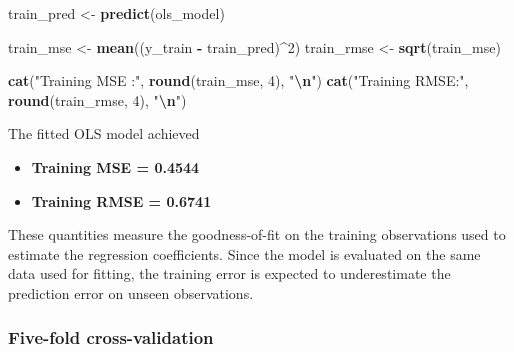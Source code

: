 \documentclass[
  11pt,
]{article}
\newenvironment{Shaded}{\begin{snugshade}}{\end{snugshade}}
\newcommand{\DecValTok}[1]{\textcolor[rgb]{0.00,0.00,0.81}{#1}}
\newcommand{\FunctionTok}[1]{\textcolor[rgb]{0.13,0.29,0.53}{\textbf{#1}}}
\newcommand{\NormalTok}[1]{#1}
\newcommand{\OtherTok}[1]{\textcolor[rgb]{0.56,0.35,0.01}{#1}}
\newcommand{\SpecialCharTok}[1]{\textcolor[rgb]{0.81,0.36,0.00}{\textbf{#1}}}
\newcommand{\StringTok}[1]{\textcolor[rgb]{0.31,0.60,0.02}{#1}}
\providecommand{\tightlist}{%
  \setlength{\itemsep}{0pt}\setlength{\parskip}{0pt}}
\begin{document}
\begin{Shaded}
\begin{Highlighting}[]
\NormalTok{train\_pred }\OtherTok{\textless{}{-}} \FunctionTok{predict}\NormalTok{(ols\_model)}

\NormalTok{train\_mse }\OtherTok{\textless{}{-}} \FunctionTok{mean}\NormalTok{((y\_train }\SpecialCharTok{{-}}\NormalTok{ train\_pred)}\SpecialCharTok{\^{}}\DecValTok{2}\NormalTok{)}
\NormalTok{train\_rmse }\OtherTok{\textless{}{-}} \FunctionTok{sqrt}\NormalTok{(train\_mse)}

\FunctionTok{cat}\NormalTok{(}\StringTok{"Training MSE :"}\NormalTok{, }\FunctionTok{round}\NormalTok{(train\_mse, }\DecValTok{4}\NormalTok{), }\StringTok{"}\SpecialCharTok{\textbackslash{}n}\StringTok{"}\NormalTok{)}
\FunctionTok{cat}\NormalTok{(}\StringTok{"Training RMSE:"}\NormalTok{, }\FunctionTok{round}\NormalTok{(train\_rmse, }\DecValTok{4}\NormalTok{), }\StringTok{"}\SpecialCharTok{\textbackslash{}n}\StringTok{"}\NormalTok{)}
\end{Highlighting}
\end{Shaded}

The fitted OLS model achieved

\begin{itemize}
\tightlist
\item
  \textbf{Training MSE = 0.4544}
\item
  \textbf{Training RMSE = 0.6741}
\end{itemize}

These quantities measure the goodness-of-fit on the training
observations used to estimate the regression coefficients. Since the
model is evaluated on the same data used for fitting, the training error
is expected to underestimate the prediction error on unseen
observations.

\subsubsection{Five-fold
cross-validation}\label{five-fold-cross-validation}
\end{document}
